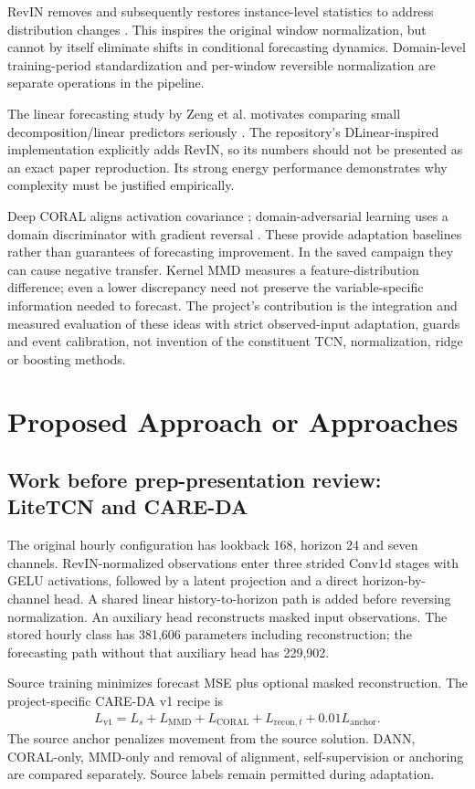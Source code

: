 \documentclass[twoside,english]{article}
\begin{document}
RevIN removes and subsequently restores instance-level statistics to address distribution changes \citep{Kim22}. This inspires the original window normalization, but cannot by itself eliminate shifts in conditional forecasting dynamics. Domain-level training-period standardization and per-window reversible normalization are separate operations in the pipeline.

The linear forecasting study by Zeng et al. motivates comparing small decomposition/linear predictors seriously \citep{Zeng23}. The repository's DLinear-inspired implementation explicitly adds RevIN, so its numbers should not be presented as an exact paper reproduction. Its strong energy performance demonstrates why complexity must be justified empirically.

Deep CORAL aligns activation covariance \citep{Sun16}; domain-adversarial learning uses a domain discriminator with gradient reversal \citep{Ganin16}. These provide adaptation baselines rather than guarantees of forecasting improvement. In the saved campaign they can cause negative transfer. Kernel MMD measures a feature-distribution difference; even a lower discrepancy need not preserve the variable-specific information needed to forecast. The project's contribution is the integration and measured evaluation of these ideas with strict observed-input adaptation, guards and event calibration, not invention of the constituent TCN, normalization, ridge or boosting methods.

\section{Proposed Approach or Approaches}\label{sec:our_proj}
\subsection{Work before prep-presentation review: LiteTCN and CARE-DA}
The original hourly configuration has lookback 168, horizon 24 and seven channels. RevIN-normalized observations enter three strided Conv1d stages with GELU activations, followed by a latent projection and a direct horizon-by-channel head. A shared linear history-to-horizon path is added before reversing normalization. An auxiliary head reconstructs masked input observations. The stored hourly class has 381,606 parameters including reconstruction; the forecasting path without that auxiliary head has 229,902.

Source training minimizes forecast MSE plus optional masked reconstruction. The project-specific CARE-DA v1 recipe is
\begin{align}
L_{\mathrm{v1}}=L_{s}+L_{\mathrm{MMD}}+L_{\mathrm{CORAL}}+L_{\mathrm{recon},t}+0.01L_{\mathrm{anchor}}.
\end{align}
The source anchor penalizes movement from the source solution. DANN, CORAL-only, MMD-only and removal of alignment, self-supervision or anchoring are compared separately. Source labels remain permitted during adaptation.
\end{document}
